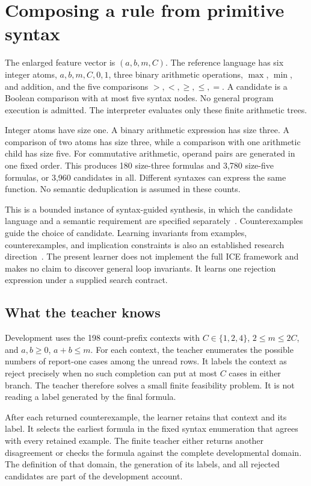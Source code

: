\documentclass[11pt,letterpaper]{article}
\theoremstyle{plain}
\theoremstyle{definition}
\begin{document}
\section{Composing a rule from primitive syntax}\label{sec:grammar-learning}
The enlarged feature vector is $(a,b,m,C)$. The reference language has six integer atoms, $a,b,m,C,0,1$, three binary arithmetic operations, $\max$, $\min$, and addition, and the five comparisons $>,<,\geq,\leq,=$. A candidate is a Boolean comparison with at most five syntax nodes. No general program execution is admitted. The interpreter evaluates only these finite arithmetic trees.

Integer atoms have size one. A binary arithmetic expression has size three. A comparison of two atoms has size three, while a comparison with one arithmetic child has size five. For commutative arithmetic, operand pairs are generated in one fixed order. This produces 180 size-three formulas and 3,780 size-five formulas, or 3,960 candidates in all. Different syntaxes can express the same function. No semantic deduplication is assumed in these counts.

This is a bounded instance of syntax-guided synthesis, in which the candidate language and a semantic requirement are specified separately~\cite{sygus}. Counterexamples guide the choice of candidate. Learning invariants from examples, counterexamples, and implication constraints is also an established research direction~\cite{ice}. The present learner does not implement the full ICE framework and makes no claim to discover general loop invariants. It learns one rejection expression under a supplied search contract.

\subsection{What the teacher knows}
Development uses the 198 count-prefix contexts with $C\in\{1,2,4\}$, $2\leq m\leq2C$, and $a,b\geq0$, $a+b\leq m$. For each context, the teacher enumerates the possible numbers of report-one cases among the unread rows. It labels the context as reject precisely when no such completion can put at most $C$ cases in either branch. The teacher therefore solves a small finite feasibility problem. It is not reading a label generated by the final formula.

After each returned counterexample, the learner retains that context and its label. It selects the earliest formula in the fixed syntax enumeration that agrees with every retained example. The finite teacher either returns another disagreement or checks the formula against the complete developmental domain. The definition of that domain, the generation of its labels, and all rejected candidates are part of the development account.
\end{document}
